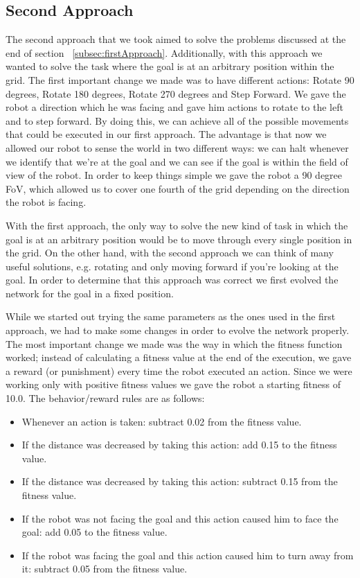 \documentclass[12pt,a4paper,twocolumn]{article}
\begin{document}
\subsection{Second Approach}
The second approach that we took aimed to solve the problems discussed at the end of section ~\ref{subsec:firstApproach}. Additionally, with this approach we wanted to solve the task where the goal is at an arbitrary position within the grid. The first important change we made was to have different actions: Rotate 90 degrees, Rotate 180 degrees, Rotate 270 degrees and Step Forward. We gave the robot a direction which he was facing and gave him actions to rotate to the left and to step forward. By doing this, we can achieve all of the possible movements that could be executed in our first approach. The advantage is that now we allowed our robot to sense the world in two different ways: we can halt whenever we identify that we're at the goal and we can see if the goal is within the field of view of the robot. In order to keep things simple we gave the robot a 90 degree FoV, which allowed us to cover one fourth of the grid depending on the direction the robot is facing. 

With the first approach, the only way to solve the new kind of task in which the goal is at an arbitrary position would be to move through every single position in the grid. On the other hand, with the second approach we can think of many useful solutions, e.g. rotating and only moving forward if you're looking at the goal. In order to determine that this approach was correct we first evolved the network for the goal in a fixed position.

While we started out trying the same parameters as the ones used in the first approach, we had to make some changes in order to evolve the network properly. The most important change we made was the way in which the fitness function worked; instead of calculating a fitness value at the end of the execution, we gave a reward (or punishment) every time the robot executed an action. Since we were working only with positive fitness values we gave the robot a starting fitness of 10.0. The behavior/reward rules are as follows:
\begin{itemize}
\item Whenever an action is taken: subtract 0.02 from the fitness value.
\item If the distance was decreased by taking this action: add 0.15 to the fitness value.
\item If the distance was decreased by taking this action: subtract 0.15 from the fitness value.
\item If the robot was not facing the goal and this action caused him to face the goal: add 0.05 to the fitness value.
\item If the robot was facing the goal and this action caused him to turn away from it: subtract 0.05 from the fitness value.
\end{itemize}
\end{document}
